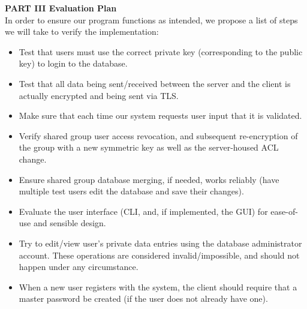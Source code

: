 \documentclass[11pt, letterpaper]{article}
\newcommand{\DesignSection}[1]
{\noindent\textbf{#1}\\}
\begin{document}
\DesignSection{PART III Evaluation Plan}
\noindent
In order to ensure our program functions as intended, we propose a list of steps we will take to verify the implementation:
\begin{itemize} \itemsep1pt \parskip0pt 
\item Test that users must use the correct private key (corresponding to the public key) to login to the database.
\item Test that all data being sent/received between the server and the client is actually encrypted and being sent via TLS.
\item Make sure that each time our system requests user input that it is validated.
\item Verify shared group user access revocation, and subsequent re-encryption of the group with a new symmetric key as well as the server-housed ACL change.
\item Ensure shared group database merging, if needed, works reliably (have multiple test users edit the database and save their changes).
\item Evaluate the user interface (CLI, and, if implemented, the GUI) for ease-of-use and sensible design.
\item Try to edit/view user’s private data  entries using the database administrator account. These operations are considered invalid/impossible, and should not happen under any circumstance.
\item When a new user registers with the system, the client should require that a master password be created (if the user does not already have one).
\end{itemize}
\end{document}
